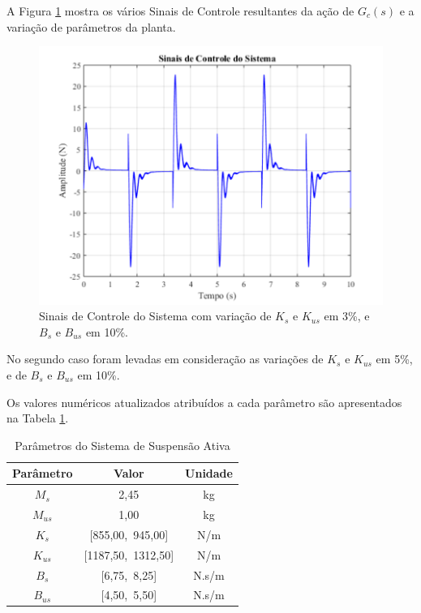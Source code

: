 \documentclass[journal,brazil,english]{IEEEtran}
\begin{document}
A Figura \ref{sinalcontroleIntervalar} mostra os vários Sinais de Controle resultantes da ação de $G_c(s)$ e a variação de parâmetros da planta.
\begin{figure}[H]
	\centering
\includegraphics[width=\columnwidth]{./imagens/sinal_de_controle_variando_Ks_Kus_Bs_Bus_controlador_sem_robustez.pdf}
	\renewcommand{\figurename}{Fig.}
    \caption{Sinais de Controle do Sistema com variação de $K_s$ e $K_{us}$ em 3\%, e $B_s$ e $B_{us}$ em 10\%.}
	\label{sinalcontroleIntervalar}
\end{figure}

No segundo caso foram levadas em consideração as variações de $K_s$ e $K_{us}$ em 5\%, e de $B_s$ e $B_{us}$ em 10\%. 


Os valores numéricos atualizados atribuídos a cada parâmetro são apresentados na Tabela \ref{parametros2}.

\begin{table}[H]{\centering}
\centering
	\caption{Parâmetros do Sistema de Suspensão Ativa}
	\begin{tabular}{|c|c|c|} \hline
   Parâmetro & Valor & Unidade \\ \hline
	$M_s$ & 2,45 & kg \\ \hline
  $M_{us}$ & 1,00 & kg \\ \hline
  $K_s$ & [855,00,~945,00] & N/m \\ \hline
  $K_{us}$ & [1187,50,~1312,50] & N/m \\ \hline
  $B_s$ & [6,75,~8,25] & N.s/m \\ \hline
  $B_{us}$ & [4,50,~5,50] & N.s/m \\ \hline
   \end{tabular}
	\label{parametros2}
\end{table}
\end{document}
